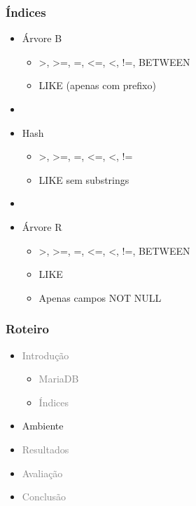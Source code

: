 \documentclass[10pt]{beamer}
\begin{document}
\begin{frame}[fragile]
  \frametitle{Índices}

    \begin{itemize}

    \item Árvore B

      \begin{itemize}
        \item[-] >, >=, =, <=, <, !=, BETWEEN
        \item[-] LIKE (apenas com prefixo)
      \end{itemize}

    \item[\ ] \ 
    \item Hash
    \begin{itemize}
      \item[-] >, >=, =, <=, <, !=
      \item[-] LIKE sem substrings
    \end{itemize}

    \item[\ ] \ 
    \item Árvore R
    \begin{itemize}
      \item[-] >, >=, =, <=, <, !=, BETWEEN
      \item[-] LIKE
      \item[-] Apenas campos NOT NULL
    \end{itemize}

    \end{itemize}



\end{frame}




\begin{frame}
  \frametitle{Roteiro}

  \begin{itemize}

    \item[\color{gray}{$\bullet$}] \textcolor{gray}{Introdução}
    
    \begin{itemize}
      \item[\ ] \textcolor{gray}{MariaDB}
      \item[\ ] \textcolor{gray}{Índices}
    \end{itemize}


    \item Ambiente

    \item[\color{gray}{$\bullet$}] \textcolor{gray}{Resultados}

    \item[\color{gray}{$\bullet$}] \textcolor{gray}{Avaliação}

    \item[\color{gray}{$\bullet$}] \textcolor{gray}{Conclusão}


  \end{itemize}

\end{frame}
\end{document}
